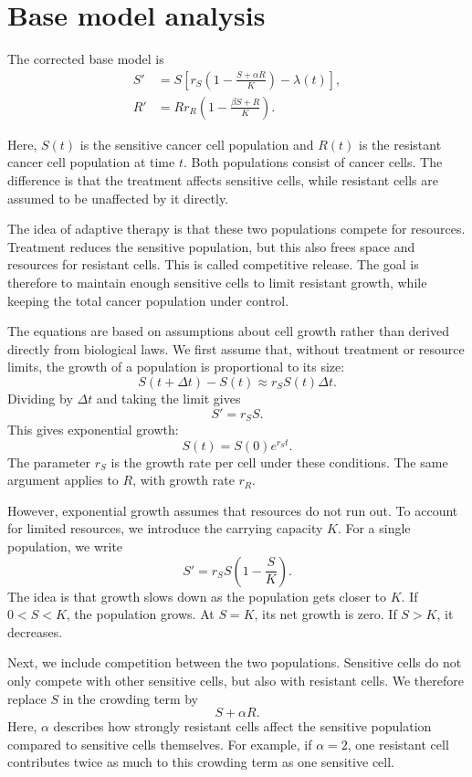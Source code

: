 \documentclass{article}
\begin{document}
\section{Base model analysis}

The corrected base model is
\[
\begin{aligned}
S' &= S\left[r_S\left(1-\frac{S+\alpha R}{K}\right)
- \lambda(t)\right], \\
R' &= Rr_R\left(1-\frac{\beta S+R}{K}\right).
\end{aligned}
\]

Here, $S(t)$ is the sensitive cancer cell population and
$R(t)$ is the resistant cancer cell population at time $t$.
Both populations consist of cancer cells. The difference is
that the treatment affects sensitive cells, while resistant
cells are assumed to be unaffected by it directly.

The idea of adaptive therapy is that these two populations
compete for resources. Treatment reduces the sensitive
population, but this also frees space and resources for
resistant cells. This is called competitive release.
The goal is therefore to maintain enough sensitive cells
to limit resistant growth, while keeping the total cancer
population under control.

The equations are based on assumptions about cell growth
rather than derived directly from biological laws.
We first assume that, without treatment or resource limits,
the growth of a population is proportional to its size:
\[
S(t+\Delta t)-S(t)
\approx r_S S(t)\Delta t.
\]
Dividing by $\Delta t$ and taking the limit gives
\[
S'=r_SS.
\]
This gives exponential growth:
\[
S(t)=S(0)e^{r_St}.
\]
The parameter $r_S$ is the growth rate per cell under these
conditions. The same argument applies to $R$, with growth
rate $r_R$.

However, exponential growth assumes that resources do not
run out. To account for limited resources, we introduce
the carrying capacity $K$. For a single population, we write
\[
S'=r_SS\left(1-\frac{S}{K}\right).
\]
The idea is that growth slows down as the population gets
closer to $K$. If $0<S<K$, the population grows.
At $S=K$, its net growth is zero. If $S>K$, it decreases.

Next, we include competition between the two populations.
Sensitive cells do not only compete with other sensitive
cells, but also with resistant cells. We therefore replace
$S$ in the crowding term by
\[
S+\alpha R.
\]
Here, $\alpha$ describes how strongly resistant cells
affect the sensitive population compared to sensitive
cells themselves. For example, if $\alpha=2$, one resistant
cell contributes twice as much to this crowding term as
one sensitive cell.
\end{document}
